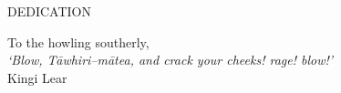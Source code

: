 \newpage
{}

\begin{center}
DEDICATION
\end{center}
\vspace{6cm}


\begin{center}
{\large To the howling southerly,}\\
\vspace{2cm}
\textit{`Blow, T\=awhiri--m\=atea, and crack your cheeks! rage! blow!'}\\
Kingi Lear
\end{center}